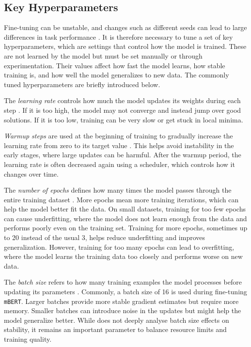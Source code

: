     
\subsection{Key Hyperparameters} \label{subsection:hyperparameters_explained}
    Fine-tuning can be unstable, and changes such as different seeds can lead to large differences in task performance \parencite{mosbachStabilityFinetuningBERT2021}. It is therefore necessary to tune a set of key hyperparameters, which are settings that control how the model is trained. These are not learned by the model but must be set manually or through experimentation. Their values affect how fast the model learns, how stable training is, and how well the model generalizes to new data. The commonly tuned hyperparameters are briefly introduced below.

    The \textit{learning rate} controls how much the model updates its weights during each step \parencite{mosbachStabilityFinetuningBERT2021}. If it is too high, the model may not converge and instead jump over good solutions. If it is too low, training can be very slow or get stuck in local minima.

    \textit{Warmup steps} are used at the beginning of training to gradually increase the learning rate from zero to its target value \parencite{mosbachStabilityFinetuningBERT2021}. This helps avoid instability in the early stages, where large updates can be harmful. After the warmup period, the learning rate is often decreased again using a scheduler, which controls how it changes over time.

    The \textit{number of epochs} defines how many times the model passes through the entire training dataset \parencite{mosbachStabilityFinetuningBERT2021}. More epochs mean more training iterations, which can help the model better fit the data. On small datasets, training for too few epochs can cause underfitting, where the model does not learn enough from the data and performs poorly even on the training set. Training for more epochs, sometimes up to 20 instead of the usual 3, helps reduce underfitting and improves generalization. However, training for too many epochs can lead to overfitting, where the model learns the training data too closely and performs worse on new data.

    The \textit{batch size} refers to how many training examples the model processes before updating its parameters \parencite{mosbachStabilityFinetuningBERT2021}. Commonly, a batch size of 16 is used during fine-tuning \texttt{mBERT}. Larger batches provide more stable gradient estimates but require more memory. Smaller batches can introduce noise in the updates but might help the model generalize better. While \textcite{mosbachStabilityFinetuningBERT2021} does not deeply analyse batch size effects on stability, it remains an important parameter to balance resource limits and training quality.

